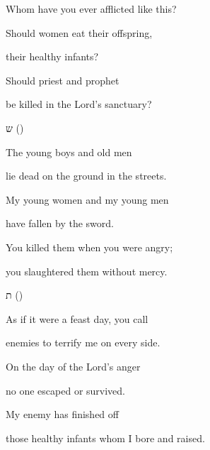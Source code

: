 {\par }{\Q Whom have you ever
afflicted like
this?
\par }{\Q Should
women
eat their
offspring,

\par }{\Q their
healthy
infants?

\par }{\Q Should
priest and
prophet
\par }{\Q be
killed in the
Lord’s sanctuary?
\par }{\SH ש ({})
\par }{\Q {}The young boys and old men
\par }{\Q lie dead on the ground in the streets.
\par }{\Q My young women and my young men
\par }{\Q have fallen by the sword.
\par }{\Q You killed them when you were angry;
\par }{\Q you slaughtered them without mercy.
\par }{\SH ת ({})
\par }{\Q {}As if it were a feast day, you call
\par }{\Q enemies to terrify me on every side.
\par }{\Q On the day of the Lord’s anger
\par }{\Q no one escaped or survived.
\par }{\Q My enemy has finished off
\par }{\Q those healthy infants whom I bore and raised.

\par }
